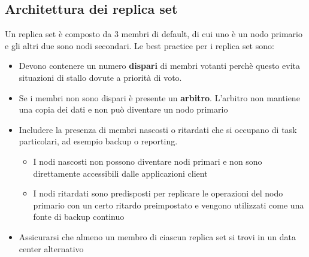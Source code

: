 \documentclass[a4paper,twoside]{article}
\begin{document}
\subsection{Architettura dei replica set}
Un replica set è composto da 3 membri di default, di cui uno è un nodo primario e gli
altri due sono nodi secondari. Le best practice per i replica set sono:
\begin{itemize}
  \item Devono contenere un numero \textbf{dispari} di membri votanti perchè questo evita situazioni di stallo
    dovute a priorità di voto.

  \item Se i membri non sono dispari è presente un \textbf{arbitro}. L'arbitro
    non mantiene una copia dei dati e non può diventare un nodo primario

  \item Includere la presenza di membri nascosti o ritardati che si occupano di
    task particolari, ad esempio backup o reporting.
    \begin{itemize}
      \item I nodi nascosti non
        possono diventare nodi primari e non sono direttamente accessibili dalle applicazioni
        client

      \item I nodi ritardati sono predisposti per replicare le operazioni del nodo
        primario con un certo ritardo preimpostato e vengono utilizzati come una
        fonte di backup continuo
    \end{itemize}


  \item Assicurarsi che almeno un membro di ciascun replica set si trovi in un data
    center alternativo
\end{itemize}
\end{document}
